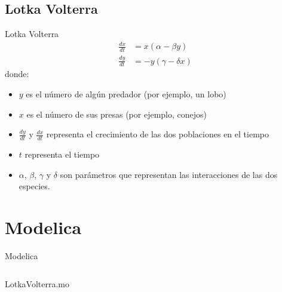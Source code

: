 \documentclass{beamer}
\begin{document}
\subsection{Lotka Volterra}
\begin{frame}{Lotka Volterra}
	\begin{align*}
		\frac{dx}{dt} &= x(\alpha - \beta y) \\
		\frac{dy}{dt} &= - y(\gamma - \delta  x)
	\end{align*}
	donde:
	\begin{itemize}
		\item $y$ es el número de algún predador (por ejemplo, un lobo)
		\item $x$ es el número de sus presas (por ejemplo, conejos)
		\item $\frac{dy}{dt}$ y $\frac{dx}{dt}$ representa el crecimiento de las dos poblaciones en el tiempo
		\item $t$ representa el tiempo 
		\item $\alpha$, $\beta$, $\gamma$ y $\delta$ son parámetros que representan las interacciones de las dos especies.
	\end{itemize}
\end{frame}



\section{Modelica}
\begin{frame}[fragile]{Modelica}
\centering
\begin{listing}[H]    
	\inputminted[linenos]{modelica}{src/LotkaVolterra.mo}
	\caption{LotkaVolterra.mo}\label{lst:LotkaVolterra.mo}
\end{listing}
\end{frame}
\end{document}
